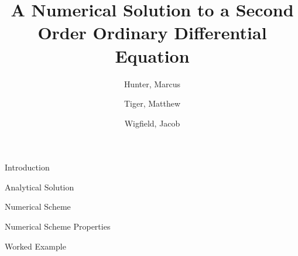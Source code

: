 \documentclass{article}
\title{
	{A Numerical Solution to a Second Order Ordinary Differential Equation}\\
}
\author{
	Hunter, Marcus \\
	\and
	Tiger, Matthew \\
	\and
	Wigfield, Jacob \\
}
\begin{document}
\maketitle
\newpage


\tableofcontents
\newpage


\begin{section}{Introduction}
  
\end{section}


\begin{section}{Analytical Solution}
  
\end{section}


\begin{section}{Numerical Scheme}\label{sec:scheme}
  
\end{section}


\begin{section}{Numerical Scheme Properties}\label{sec:scheme_prop}
  
\end{section}


\begin{section}{Worked Example}
  
\end{section}
\end{document}
